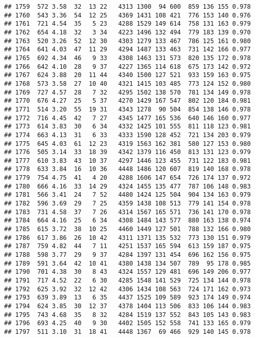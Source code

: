\documentclass[]{article}
\begin{document}
\begin{verbatim}
## 1759  572 3.58  32  13 22   4313 1300  94 600  859 136 155 0.978
## 1760  543 3.36  54  12 25   4369 1431 108 421  776 153 140 0.976
## 1761  721 4.54  35   5 23   4288 1529 149 614  758 131 163 0.979
## 1762  654 4.18  32   3 34   4223 1496 132 494  779 183 139 0.970
## 1763  520 3.26  52  12 30   4303 1279 133 467  786 125 161 0.980
## 1764  641 4.03  47  11 29   4294 1487 133 463  731 142 166 0.977
## 1765  692 4.34  46   9 33   4308 1463 131 573  820 135 172 0.978
## 1766  642 4.10  28   9 37   4227 1365 114 618  675 173 142 0.972
## 1767  624 3.88  20  11 44   4340 1500 127 521  933 159 163 0.975
## 1768  573 3.58  27  10 40   4321 1415 103 485  773 124 152 0.980
## 1769  727 4.57  28   7 32   4295 1502 138 570  781 134 149 0.978
## 1770  676 4.27  25   5 37   4270 1429 167 547  802 120 184 0.981
## 1771  514 3.20  55  19 31   4343 1278  90 504  854 138 146 0.978
## 1772  716 4.45  42   7 27   4345 1477 165 536  640 146 160 0.977
## 1773  614 3.83  30   6 34   4332 1425 101 555  811 118 123 0.981
## 1774  663 4.13  31   6 33   4333 1590 128 452  721 134 203 0.979
## 1775  645 4.03  61  12 23   4319 1563 162 381  580 127 153 0.980
## 1776  505 3.14  33  18 39   4342 1379 116 450  813 131 123 0.979
## 1777  610 3.83  43  10 37   4297 1446 123 455  731 122 183 0.981
## 1778  633 3.84  16  10 36   4448 1486 120 607  819 140 168 0.978
## 1779  754 4.75  41   4 20   4288 1606 147 654  726 174 137 0.972
## 1780  666 4.16  33  14 29   4324 1455 135 477  787 106 148 0.983
## 1781  566 3.41  24   7 52   4480 1424 125 504  904 134 163 0.979
## 1782  596 3.69  29   7 25   4359 1438 108 513  779 141 154 0.978
## 1783  731 4.58  37   7 26   4314 1567 165 571  736 141 170 0.978
## 1784  664 4.16  25   6 34   4308 1484 143 577  880 163 138 0.974
## 1785  615 3.72  38  10 25   4460 1449 127 501  788 132 166 0.980
## 1786  617 3.86  26  10 42   4311 1371 135 532  773 130 151 0.979
## 1787  759 4.82  44   7 11   4251 1537 165 594  613 159 187 0.975
## 1788  598 3.77  29   9 37   4284 1397 131 454  696 162 156 0.975
## 1789  591 3.64  42  10 41   4380 1438 134 507  789  95 178 0.985
## 1790  701 4.38  30   8 43   4324 1557 129 481  696 149 206 0.977
## 1791  717 4.52  22   6 30   4285 1548 141 529  725 134 144 0.978
## 1792  625 3.92  32  12 42   4306 1434 108 563  724 171 162 0.973
## 1793  639 3.89  13   6 35   4437 1525 109 589  923 174 149 0.974
## 1794  624 3.85  30  12 37   4378 1404 113 506  833 106 144 0.983
## 1795  743 4.68  35   8 32   4284 1519 137 552  843 105 143 0.983
## 1796  693 4.25  40   9 30   4402 1505 152 558  741 133 165 0.979
## 1797  511 3.10  31  18 41   4448 1367  69 466  929 140 145 0.978

\end{verbatim}
\end{document}
